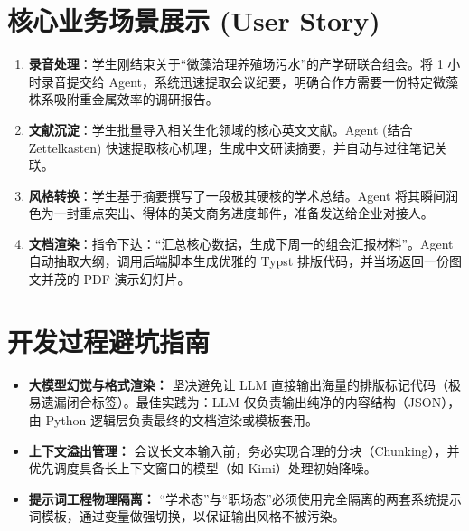 \documentclass[12pt, a4paper]{ctexart}
\begin{document}
\section{核心业务场景展示 (User Story)}

\begin{tcolorbox}[colback=gray!5, colframe=primary, title=\textbf{场景演示：课题组的周五下午}]
\begin{enumerate}[label=\arabic*.]
    \item \textbf{录音处理}：学生刚结束关于“微藻治理养殖场污水”的产学研联合组会。将 1 小时录音提交给 Agent，系统迅速提取会议纪要，明确合作方需要一份特定微藻株系吸附重金属效率的调研报告。
    \item \textbf{文献沉淀}：学生批量导入相关生化领域的核心英文文献。Agent (结合 Zettelkasten) 快速提取核心机理，生成中文研读摘要，并自动与过往笔记关联。
    \item \textbf{风格转换}：学生基于摘要撰写了一段极其硬核的学术总结。Agent 将其瞬间润色为一封重点突出、得体的英文商务进度邮件，准备发送给企业对接人。
    \item \textbf{文档渲染}：指令下达：“汇总核心数据，生成下周一的组会汇报材料”。Agent 自动抽取大纲，调用后端脚本生成优雅的 Typst 排版代码，并当场返回一份图文并茂的 PDF 演示幻灯片。
\end{enumerate}
\end{tcolorbox}

\section{开发过程避坑指南}
\begin{itemize}
    \item \textbf{大模型幻觉与格式渲染：} 坚决避免让 LLM 直接输出海量的排版标记代码（极易遗漏闭合标签）。最佳实践为：LLM 仅负责输出纯净的内容结构（JSON），由 Python 逻辑层负责最终的文档渲染或模板套用。
    \item \textbf{上下文溢出管理：} 会议长文本输入前，务必实现合理的分块（Chunking），并优先调度具备长上下文窗口的模型（如 Kimi）处理初始降噪。
    \item \textbf{提示词工程物理隔离：} “学术态”与“职场态”必须使用完全隔离的两套系统提示词模板，通过变量做强切换，以保证输出风格不被污染。
\end{itemize}
\end{document}
